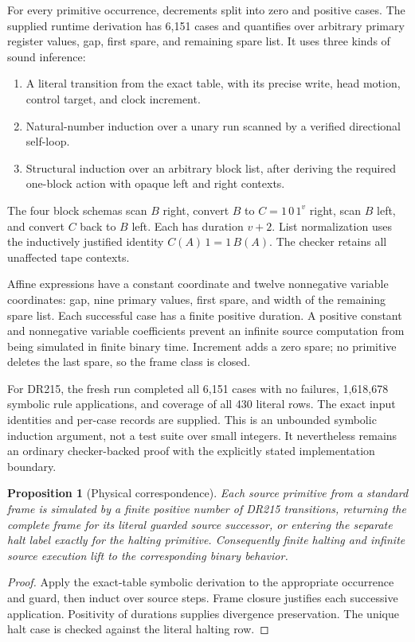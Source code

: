 \documentclass[11pt,a4paper]{article}
\newtheorem{proposition}[theorem]{Proposition}
\theoremstyle{definition}
\numberwithin{equation}{section}
\begin{document}
For every primitive occurrence, decrements split into zero and positive
cases. The supplied runtime derivation has 6,151 cases and quantifies
over arbitrary primary register values, gap, first spare, and remaining
spare list. It uses three kinds of sound inference:

\begin{enumerate}
\item A literal transition from the exact table, with its precise write,
head motion, control target, and clock increment.
\item Natural-number induction over a unary run scanned by a verified
directional self-loop.
\item Structural induction over an arbitrary block list, after deriving
the required one-block action with opaque left and right contexts.
\end{enumerate}

The four block schemas scan $B$ right, convert $B$ to $C=1\,0\,1^v$
right, scan $B$ left, and convert $C$ back to $B$ left. Each has duration
$v+2$. List normalization uses the inductively justified identity
$C(A)\,1=1\,B(A)$. The checker retains all unaffected tape contexts.

Affine expressions have a constant coordinate and twelve nonnegative
variable coordinates: gap, nine primary values, first spare, and width
of the remaining spare list. Each successful case has a finite positive
duration. A positive constant and nonnegative variable coefficients
prevent an infinite source computation from being simulated in finite
binary time. Increment adds a zero spare; no primitive deletes the last
spare, so the frame class is closed.

For DR215, the fresh run completed all 6,151 cases with no failures,
1,618,678 symbolic rule applications, and coverage of all 430 literal
rows. The exact input identities and per-case records are supplied.
This is an unbounded symbolic induction argument, not a test suite over
small integers. It nevertheless remains an ordinary checker-backed
proof with the explicitly stated implementation boundary.

\begin{proposition}[Physical correspondence]
Each source primitive from a standard frame is simulated by a finite
positive number of DR215 transitions, returning the complete frame for
its literal guarded source successor, or entering the separate halt
label exactly for the halting primitive. Consequently finite halting
and infinite source execution lift to the corresponding binary behavior.
\end{proposition}
\begin{proof}
Apply the exact-table symbolic derivation to the appropriate occurrence
and guard, then induct over source steps. Frame closure justifies each
successive application. Positivity of durations supplies divergence
preservation. The unique halt case is checked against the literal
halting row.
\end{proof}
\end{document}
